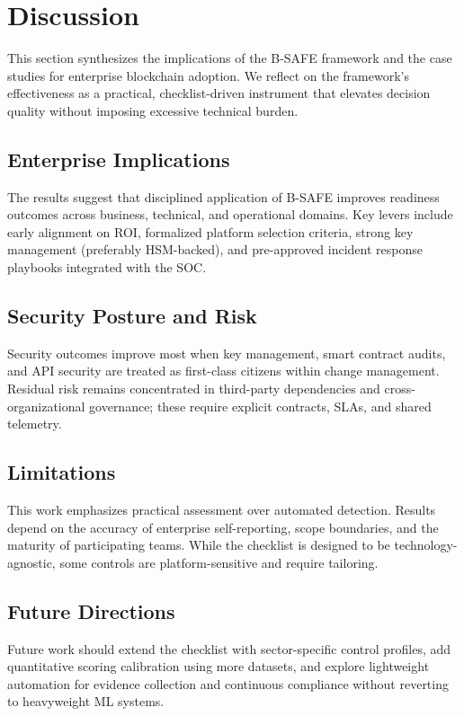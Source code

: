 \section{Discussion}
This section synthesizes the implications of the B-SAFE framework and the case studies for enterprise blockchain adoption. We reflect on the framework's effectiveness as a practical, checklist-driven instrument that elevates decision quality without imposing excessive technical burden.

\subsection*{Enterprise Implications}
The results suggest that disciplined application of B-SAFE improves readiness outcomes across business, technical, and operational domains. Key levers include early alignment on ROI, formalized platform selection criteria, strong key management (preferably HSM-backed), and pre-approved incident response playbooks integrated with the SOC.

\subsection*{Security Posture and Risk}
Security outcomes improve most when key management, smart contract audits, and API security are treated as first-class citizens within change management. Residual risk remains concentrated in third-party dependencies and cross-organizational governance; these require explicit contracts, SLAs, and shared telemetry.

\subsection*{Limitations}
This work emphasizes practical assessment over automated detection. Results depend on the accuracy of enterprise self-reporting, scope boundaries, and the maturity of participating teams. While the checklist is designed to be technology-agnostic, some controls are platform-sensitive and require tailoring.

\subsection*{Future Directions}
Future work should extend the checklist with sector-specific control profiles, add quantitative scoring calibration using more datasets, and explore lightweight automation for evidence collection and continuous compliance without reverting to heavyweight ML systems.